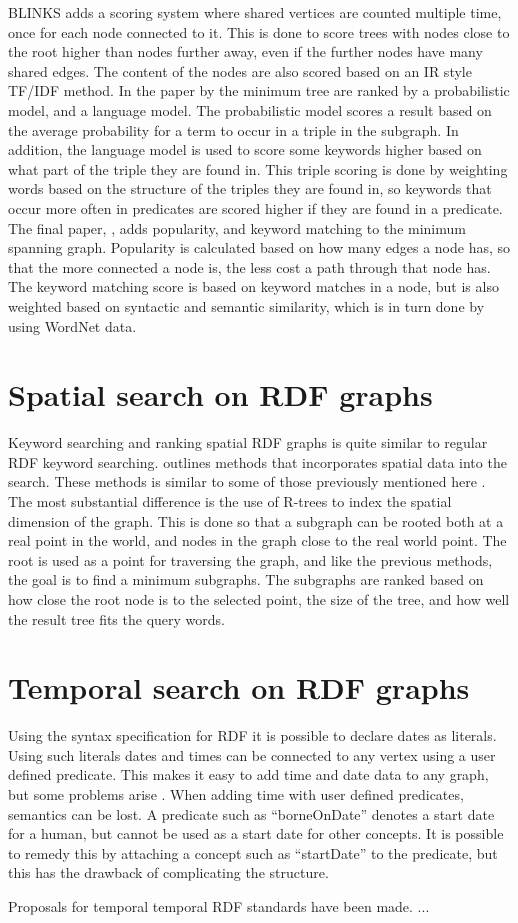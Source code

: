 BLINKS adds a scoring system where shared vertices are counted multiple time, once for each node connected to it. This is done to score trees with nodes close to the root higher than nodes further away, even if the further nodes have many shared edges. The content of the nodes are also scored based on an IR style TF/IDF method. In the paper by \cite{Elbassuoni:2011:KSO:2063576.2063615} the minimum tree are ranked by a probabilistic model, and a language model. The probabilistic model scores a result based on the average probability for a term to occur in a triple in the subgraph. In addition, the language model is used to score some keywords higher based on what part of the triple they are found in. This triple scoring is done by weighting words based on the structure of the triples they are found in, so keywords that occur more often in predicates are scored higher if they are found in a predicate. The final paper, \cite{4812421}, adds popularity, and keyword matching to the minimum spanning graph. Popularity is calculated based on how many edges a node has, so that the more connected a node is, the less cost a path through that node has. The keyword matching score is based on keyword matches in a node, but is also weighted based on syntactic and semantic similarity, which is in turn done by using WordNet data.

\section{Spatial search on RDF graphs}
Keyword searching and ranking spatial RDF graphs is quite similar to regular RDF keyword searching. \cite{Shi:2016:TRS:2882903.2882941} outlines methods that incorporates spatial data into the search. These methods is similar to some of those previously mentioned here \citep{4812421, Elbassuoni:2011:KSO:2063576.2063615}. The most substantial difference is the use of R-trees to index the spatial dimension of the graph. This is done so that a subgraph can be rooted both at a real point in the world, and nodes in the graph close to the real world point. The root is used as a point for traversing the graph, and like the previous methods, the goal is to find a minimum subgraphs. The subgraphs are ranked based on how close the root node is to the selected point, the size of the tree, and how well the result tree fits the query words.

\section{Temporal search on RDF graphs}
Using the syntax specification for RDF \cite{beckett2004rdf} it is possible to declare dates as literals. Using such literals dates and times can be connected to any vertex using a user defined predicate. This makes it easy to add time and date data to any graph, but some problems arise \cite{tappolet2009applied}. When adding time with user defined predicates, semantics can be lost. A predicate such as ``borneOnDate'' denotes a start date for a human, but cannot be used as a start date for other concepts. It is possible to remedy this by attaching a concept such as ``startDate'' to the predicate, but this has the drawback of complicating the structure.

Proposals for temporal temporal RDF standards have been made. ...\\

\glsresetall